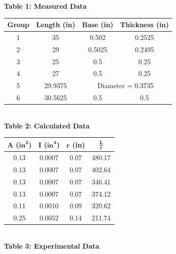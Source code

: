 \documentclass{article}
\begin{document}
    \begin{center}
        \doublespacing
    {\large{\bf Table 1: Measured Data\\}}
    \vspace{3mm}
    \begin{tabular}{|c c c c|}
        \hline
        \textbf{Group} & \textbf{Length (in)} & \textbf{Base (in)} & \textbf{Thickness (in)} \\\hline
        1  & 35      & 0.502        & 0.2525      \\
        2  & 29      & 0.5025       & 0.2495      \\
        3  & 25      & 0.5          & 0.25        \\
        4  & 27      & 0.5          & 0.25        \\
        5  & 29.9375 & \multicolumn{2}{c|}{Diameter = 0.3735}  \\
        6  & 30.5625 & 0.5          & 0.5        \\\hline
    \end{tabular}
    \vspace{6mm}
    {\large{\bf \\Table 2: Calculated Data\\}}
    \vspace{3mm}
    \begin{tabular}{|c c c c|}
        \hline
        \(\bm{A}\) (\(\textbf{in}^{\bm{2}}\)) & \(\bm{I}\) (\(\textbf{in}^{\bm{4}}\)) & \(\bm{r}\) \textbf{(in)} & \(\bm{\frac{L}{r}}\) \\\hline
        0.13 & 0.0007 & 0.07 & 480.17 \\
        0.13 & 0.0007 & 0.07 & 402.64 \\
        0.13 & 0.0007 & 0.07 & 346.41 \\
        0.13 & 0.0007 & 0.07 & 374.12 \\
        0.11 & 0.0010 & 0.09 & 320.62 \\
        0.25 & 0.0052 & 0.14 & 211.74 \\\hline
    \end{tabular}
    \vspace{6mm}
    {\large{\bf \\Table 3: Experimental Data\\}}
    \vspace{3mm}
    \begin{tabular}{|c c c|}

\end{tabular}
\end{center}
\end{document}
